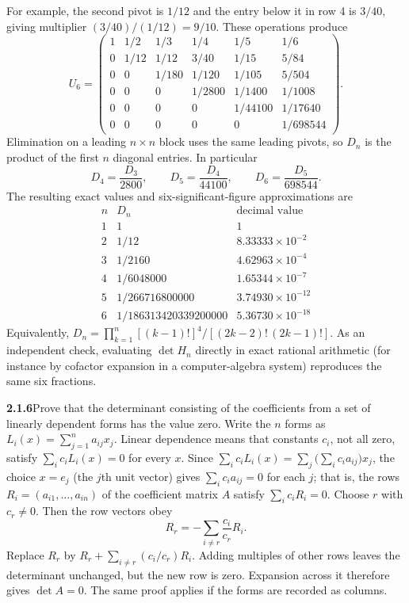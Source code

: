 For example, the second pivot is $1/12$ and the entry below it
in row 4 is $3/40$, giving multiplier $(3/40)/(1/12)=9/10$.
These operations produce
\[
U_6=\begin{pmatrix}
1&1/2&1/3&1/4&1/5&1/6\\
0&1/12&1/12&3/40&1/15&5/84\\
0&0&1/180&1/120&1/105&5/504\\
0&0&0&1/2800&1/1400&1/1008\\
0&0&0&0&1/44100&1/17640\\
0&0&0&0&0&1/698544
\end{pmatrix}.
\]
Elimination on a leading $n\times n$ block uses the same leading
pivots, so $D_n$ is the product of the first $n$ diagonal entries.
In particular
\[
D_4=\frac{D_3}{2800},\qquad
D_5=\frac{D_4}{44100},\qquad
D_6=\frac{D_5}{698544}.
\]
The resulting exact values and six-significant-figure approximations are
\[
\boxed{\begin{array}{c|c|c}
n&D_n&\text{decimal value}\\\hline
1&1&1\\
2&1/12&8.33333\times10^{-2}\\
3&1/2160&4.62963\times10^{-4}\\
4&1/6048000&1.65344\times10^{-7}\\
5&1/266716800000&3.74930\times10^{-12}\\
6&1/186313420339200000&5.36730\times10^{-18}
\end{array}}
\]
Equivalently, $D_n=\prod_{k=1}^n[(k-1)!]^4/[(2k-2)!\,(2k-1)!]$.
As an independent check, evaluating $\det H_n$ directly in exact
rational arithmetic (for instance by cofactor expansion in a
computer-algebra system) reproduces the same six fractions.

\par\bigskip
\noindent\textbf{2.1.6}\quad Prove that the determinant consisting of the
coefficients from a set of linearly dependent forms has the value zero.
\solution
Write the $n$ forms as $L_i(x)=\sum_{j=1}^n a_{ij}x_j$.
Linear dependence means that constants $c_i$, not all zero, satisfy
$\sum_i c_iL_i(x)=0$ for every $x$.
Since $\sum_i c_iL_i(x)=\sum_j\bigl(\sum_i c_ia_{ij}\bigr)x_j$, the
choice $x=e_j$ (the $j$th unit vector) gives $\sum_i c_i a_{ij}=0$ for
each $j$; that is, the rows $R_i=(a_{i1},\ldots,a_{in})$ of the
coefficient matrix $A$ satisfy $\sum_i c_iR_i=0$.
Choose $r$ with $c_r\ne0$. Then the row vectors obey
\[
R_r=-\sum_{i\ne r}\frac{c_i}{c_r}R_i.
\]
Replace $R_r$ by $R_r+\sum_{i\ne r}(c_i/c_r)R_i$.
Adding multiples of other rows leaves the determinant unchanged, but
the new row is zero. Expansion across it therefore gives
$\boxed{\det A=0}$.
The same proof applies if the forms are recorded as columns.

